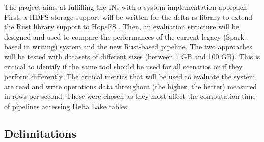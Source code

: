 The project aims at fulfilling the \glspl{IN} with a system implementation approach. First, a \gls{HDFS} storage support will be written for the delta-rs library to extend the Rust library support to \gls{HopsFS} \cite{niaziHopsFSScalingHierarchical2017}. Then, an evaluation structure will be designed and used to compare the performances of the current legacy (Spark-based in writing) system and the new Rust-based pipeline. The two approaches will be tested with datasets of different sizes (between 1 GB and 100 GB). This is critical to identify if the same tool should be used for all scenarios or if they perform differently. The critical metrics that will be used to evaluate the system are read and write operations data throughout (the higher, the better) measured in rows per second. These were chosen as they most affect the computation time of pipelines accessing Delta Lake tables.

\subsection{Delimitations}
    \label{subsec:delimitations}
    